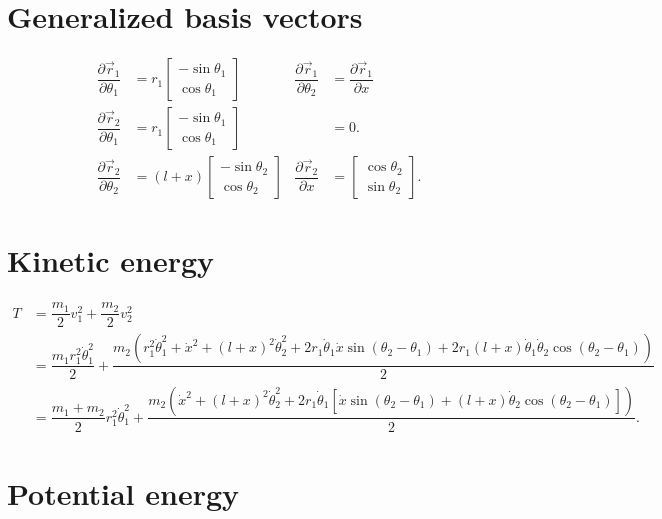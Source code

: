 \documentclass[12pt,a4paper,portrait]{article}
\begin{document}
	\section{Generalized basis vectors}
	\begin{align*}
		\dfrac{\partial \vec{r}_1}{\partial \theta_1} &= r_1\begin{bmatrix}
			-\sin{\theta_1} \\
			\cos{\theta_1}
		\end{bmatrix} & \dfrac{\partial \vec{r}_1}{\partial \theta_2} &= \dfrac{\partial \vec{r}_1}{\partial x} \\
		\dfrac{\partial \vec{r}_2}{\partial \theta_1} &= r_1\begin{bmatrix}
			-\sin{\theta_1} \\
			\cos{\theta_1}
		\end{bmatrix} & &= 0. \\
		\dfrac{\partial \vec{r}_2}{\partial \theta_2} &= (l+x)\begin{bmatrix}
			-\sin{\theta_2} \\
			\cos{\theta_2}
		\end{bmatrix} & \dfrac{\partial \vec{r}_2}{\partial x} &= \begin{bmatrix}
		\cos{\theta_2}\\
		\sin{\theta_2}
		\end{bmatrix}.
	\end{align*}
	
	\section{Kinetic energy}
	\begin{align*}
		T &= \dfrac{m_1}{2}v_1^2 + \dfrac{m_2}{2}v_2^2 \\
		&= \dfrac{m_1r_1^2 \dot{\theta}_1^2}{2} + \dfrac{m_2(r_1^2 \dot{\theta}_1^2 + \dot{x}^2 + (l+x)^2\dot{\theta}_2^2 + 2r_1\dot{\theta}_1 \dot{x} \sin{(\theta_2-\theta_1)} + 2r_1(l+x)\dot{\theta}_1\dot{\theta}_2\cos{(\theta_2 - \theta_1)})}{2}\\
		&= \dfrac{m_1+m_2}{2}r_1^2\dot{\theta}_1^2 + \dfrac{m_2(\dot{x}^2 + (l+x)^2\dot{\theta}_2^2 + 2r_1\dot{\theta}_1[ \dot{x} \sin{(\theta_2-\theta_1)} + (l+x)\dot{\theta}_2\cos{(\theta_2 - \theta_1)}])}{2}.
	\end{align*}
	
	\section{Potential energy}
\end{document}
